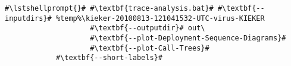 \begin{lstlisting}[caption=Commands to produce the diagrams under Windows,label=lst:traceAnalysis:sequenceDiagramWin]
#\lstshellprompt{}# #\textbf{trace-analysis.bat}# #\textbf{--inputdirs}# %temp%\kieker-20100813-121041532-UTC-virus-KIEKER
                    #\textbf{--outputdir}# out\
                    #\textbf{--plot-Deployment-Sequence-Diagrams}#
                    #\textbf{--plot-Call-Trees}#
		    #\textbf{--short-labels}#
\end{lstlisting}
